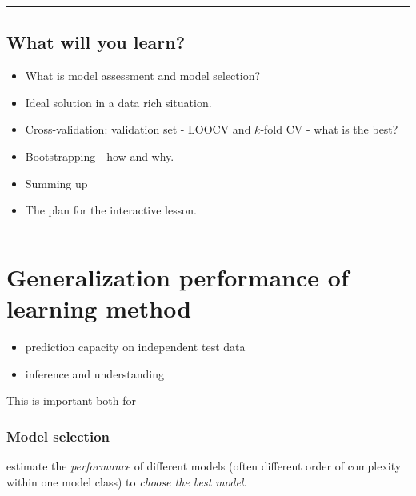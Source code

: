 \documentclass[]{article}
\providecommand{\tightlist}{%
  \setlength{\itemsep}{0pt}\setlength{\parskip}{0pt}}
\begin{document}
\begin{center}\rule{0.5\linewidth}{\linethickness}\end{center}

\hypertarget{what-will-you-learn}{%
\subsection{What will you learn?}\label{what-will-you-learn}}

\begin{itemize}
\tightlist
\item
  What is model assessment and model selection?
\item
  Ideal solution in a data rich situation.
\item
  Cross-validation: validation set - LOOCV and \(k\)-fold CV - what is
  the best?
\item
  Bootstrapping - how and why.
\item
  Summing up
\item
  The plan for the interactive lesson.
\end{itemize}

\begin{center}\rule{0.5\linewidth}{\linethickness}\end{center}

\hypertarget{generalization-performance-of-learning-method}{%
\section{Generalization performance of learning
method}\label{generalization-performance-of-learning-method}}

\begin{itemize}
\tightlist
\item
  prediction capacity on independent test data
\item
  inference and understanding
\end{itemize}

This is important both for

\hypertarget{model-selection}{%
\subsubsection{Model selection}\label{model-selection}}

estimate the \emph{performance} of different models (often different
order of complexity within one model class) to \emph{choose the best
model}.
\end{document}
